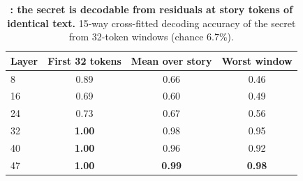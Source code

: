 \begin{table}[h]
    \centering
    \caption{{\bf \mone: the secret is decodable from residuals at story tokens of identical text.} 15-way cross-fitted decoding accuracy of the secret from 32-token windows (chance 6.7\%).}
    \label{tab:m1}
    \small
    \begin{tabular}{@{}lccc@{}}
        \toprule
        \textbf{Layer} & \textbf{First 32 tokens} & \textbf{Mean over story} & \textbf{Worst window} \\
        \midrule
        8 & 0.89 & 0.66 & 0.46 \\
        16 & 0.69 & 0.60 & 0.49 \\
        24 & 0.73 & 0.67 & 0.56 \\
        32 & {\bf 1.00} & 0.98 & 0.95 \\
        40 & {\bf 1.00} & 0.96 & 0.92 \\
        47 & {\bf 1.00} & {\bf 0.99} & {\bf 0.98} \\
        \bottomrule
    \end{tabular}
\end{table}

